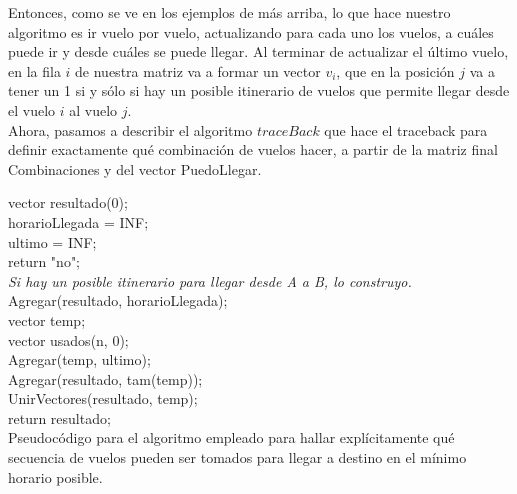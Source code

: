 \documentclass[11pt, a4paper, twoside]{article}
\begin{document}
Entonces, como se ve en los ejemplos de más arriba, lo que hace nuestro algoritmo
es ir vuelo por vuelo, actualizando para cada uno los vuelos, a cuáles puede
ir y desde cuáles se puede llegar. Al terminar de actualizar el último vuelo,
en la fila $i$ de nuestra matriz va a formar un vector $v_{i}$, que en la posición
$j$ va a tener un 1 si y sólo si hay un posible itinerario de vuelos que permite
llegar desde el vuelo $i$ al vuelo $j$. \\

Ahora, pasamos a describir el algoritmo $traceBack$ que hace el traceback para definir exactamente
qué combinación de vuelos hacer, a partir de la matriz final Combinaciones y del vector 
PuedoLlegar. \\

\begin{algorithm}[H]
  vector resultado(0); \\
  horarioLlegada = INF; \\
  ultimo = INF; \\
   {
		return "no"; \\
  }
  \BlankLine 
  \emph{Si hay un posible itinerario para llegar desde A a B, lo construyo.} \\
  Agregar(resultado, horarioLlegada); \\
  vector temp; \\
  vector usados(n, 0); \\
        Agregar(temp, ultimo); \\
  Agregar(resultado, tam(temp)); \\
  UnirVectores(resultado, temp); \\
  return resultado; \\

\caption{Pseudocódigo para el algoritmo empleado para hallar explícitamente 
         qué secuencia de vuelos pueden ser tomados para llegar a destino
         en el mínimo horario posible.}
\end{algorithm}
\end{document}
